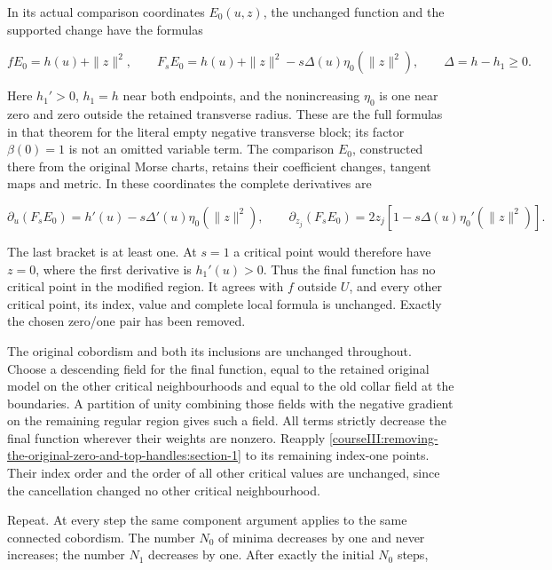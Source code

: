 In its actual comparison coordinates \(E_0(u,z)\), the unchanged function and the supported change have the formulas

\begin{equation}
fE_0=h(u)+\|z\|^2,\qquad
 F_sE_0=h(u)+\|z\|^2-s\Delta(u)\eta_0(\|z\|^2),
 \qquad
 \Delta=h-h_1\geq0.
 \label{courseIII:removing-the-original-zero-and-top-handles:eq:3.2}
\end{equation}

Here \(h_1'>0\), \(h_1=h\) near both endpoints, and the nonincreasing \(\eta_0\) is one near zero and zero outside the retained transverse radius. These are the full formulas in that theorem for the literal empty negative transverse block; its factor \(\beta(0)=1\) is not an omitted variable term. The comparison \(E_0\), constructed there from the original Morse charts, retains their coefficient changes, tangent maps and metric. In these coordinates the complete derivatives are

\begin{equation}
\partial_u(F_sE_0)=h'(u)-s\Delta'(u)\eta_0(\|z\|^2),
 \qquad
 \partial_{z_j}(F_sE_0)
 =2z_j[1-s\Delta(u)\eta_0'(\|z\|^2)].
 \label{courseIII:removing-the-original-zero-and-top-handles:eq:3.3}
\end{equation}

The last bracket is at least one. At \(s=1\) a critical point would therefore have \(z=0\), where the first derivative is \(h_1'(u)>0\). Thus the final function has no critical point in the modified region. It agrees with \(f\) outside \(U\), and every other critical point, its index, value and complete local formula is unchanged. Exactly the chosen zero/one pair has been removed.

The original cobordism and both its inclusions are unchanged throughout. Choose a descending field for the final function, equal to the retained original model on the other critical neighbourhoods and equal to the old collar field at the boundaries. A partition of unity combining those fields with the negative gradient on the remaining regular region gives such a field. All terms strictly decrease the final function wherever their weights are nonzero. Reapply \cref{courseIII:removing-the-original-zero-and-top-handles:section-1} to its remaining index-one points. Their index order and the order of all other critical values are unchanged, since the cancellation changed no other critical neighbourhood.

Repeat. At every step the same component argument applies to the same connected cobordism. The number \(N_0\) of minima decreases by one and never increases; the number \(N_1\) decreases by one. After exactly the initial \(N_0\) steps,


